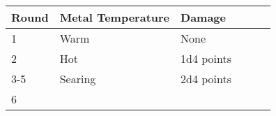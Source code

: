 \begin{longtable}{llllll}
\hline
\multicolumn{1}{|p{0.552in}|}{\begin{minipage}[t]{0.552in}\raggedright
\textbf{Round}\end{minipage}} & \multicolumn{1}{p{1.319in}|}{\begin{minipage}[t]{1.319in}\raggedright
\textbf{Metal Temperature}\end{minipage}} & \multicolumn{1}{p{0.733in}|}{\begin{minipage}[t]{0.733in}\raggedright
\textbf{Damage}\end{minipage}}\\
\hline
\multicolumn{1}{p{0.069in}|}{\begin{minipage}[t]{0.069in}\raggedright
1\end{minipage}} & \multicolumn{1}{p{0.069in}|}{\begin{minipage}[t]{0.069in}\raggedright
Warm\end{minipage}} & \multicolumn{1}{p{0.069in}|}{\begin{minipage}[t]{0.069in}\raggedright
None\end{minipage}}\\
\hline
\multicolumn{1}{|p{0.552in}|}{\begin{minipage}[t]{0.552in}\raggedright
2\end{minipage}} & \multicolumn{1}{p{1.319in}|}{\begin{minipage}[t]{1.319in}\raggedright
Hot\end{minipage}} & \multicolumn{1}{p{0.733in}|}{\begin{minipage}[t]{0.733in}\raggedright
1d4 points\end{minipage}}\\
\hline
\multicolumn{1}{p{0.069in}|}{\begin{minipage}[t]{0.069in}\raggedright
3-5\end{minipage}} & \multicolumn{1}{p{0.069in}|}{\begin{minipage}[t]{0.069in}\raggedright
Searing\end{minipage}} & \multicolumn{1}{p{0.069in}|}{\begin{minipage}[t]{0.069in}\raggedright
2d4 points\end{minipage}}\\
\hline
\multicolumn{1}{|p{0.552in}|}{\begin{minipage}[t]{0.552in}\raggedright
6\end{minipage}} & \multicolumn{1}{p{1.319in}|}{\begin{minipage}[t]{1.319in}\raggedright

\end{minipage}}
\end{longtable}
